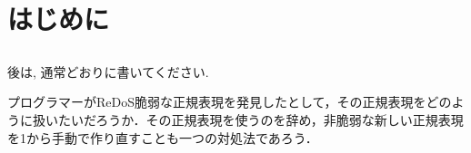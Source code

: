 \documentclass[a4paper, 12pt, dvipdfmx, uplatex]{jsreport}
\begin{document}
\chapter{はじめに}
\section{}
\subsection{}
後は, 通常どおりに書いてください.


プログラマーがReDoS脆弱な正規表現を発見したとして，その正規表現をどのように扱いたいだろうか．その正規表現を使うのを辞め，非脆弱な新しい正規表現を1から手動で作り直すことも一つの対処法であろう．
\end{document}
